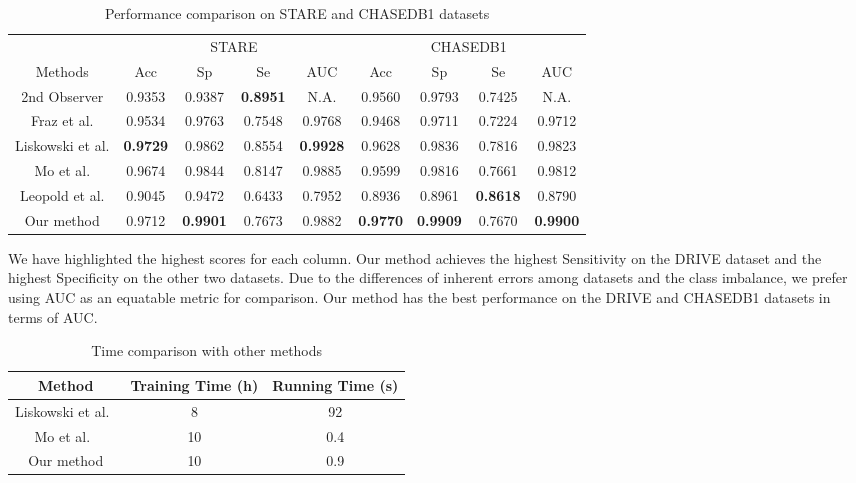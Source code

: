\documentclass[runningheads,a4paper]{llncs}
\begin{document}
\begin{table}[h]
	\centering
	\vspace{-5pt}
	\caption{Performance comparison on STARE and CHASEDB1 datasets}
	\vspace{-5pt}
	\begin{tabular}{c|c|c|c|c|c|c|c|c}
		\toprule
		&\multicolumn{4}{|c|}{STARE}&\multicolumn{4}{|c}{CHASEDB1}\\
		Methods&Acc&Sp&Se&AUC&Acc&Sp&Se&AUC\\
		\midrule	
		2nd Observer&0.9353&0.9387&\textbf{0.8951}&N.A.&0.9560&0.9793&0.7425&N.A.\\
		Fraz et al. \cite{fraz2012ensemble}	&0.9534	&0.9763	&0.7548	&0.9768&0.9468	&0.9711	&0.7224	&0.9712\\
		Liskowski et al. \cite{liskowski2016segmenting} &\textbf{0.9729}	&0.9862	&0.8554	&\textbf{0.9928}&0.9628	&0.9836	&0.7816	&0.9823\\
		Mo et al. \cite{mo2017multi}	&0.9674	&0.9844	&0.8147	&0.9885&0.9599	&0.9816	&0.7661	&0.9812\\
		Leopold et al. \cite{leopold2017pixelbnn}	&0.9045	&0.9472	&0.6433	&0.7952&0.8936	&0.8961	&\textbf{0.8618}	&0.8790\\
		Our method	&0.9712	&\textbf{0.9901}	&0.7673	&0.9882&\textbf{0.9770}	&\textbf{0.9909}	&0.7670	&\textbf{0.9900}\\
		\bottomrule
	\end{tabular}
	\vspace{-15pt}
	\label{table3}
\end{table}
We have highlighted the highest scores for each column. Our method achieves the highest Sensitivity on the DRIVE dataset and the highest Specificity on the other two datasets. Due to the differences of inherent errors among datasets and the class imbalance, we prefer using AUC as an equatable metric for comparison. Our method has the best performance on the DRIVE and CHASEDB1 datasets in terms of AUC.

\begin{table}[h]
	\centering
	\vspace{-15pt}
	\caption{Time comparison with other methods}
	\vspace{-5pt}
	\begin{tabular}{ccc}
		\toprule
		Method	&Training Time (h)	&Running Time (s)\\
		\midrule	
		Liskowski et al.~\cite{liskowski2016segmenting}	&8	&92\\
		Mo et al.~\cite{mo2017multi}	&10	&0.4\\
		Our method	&10	&0.9\\
		\bottomrule
	\end{tabular}
	\vspace{-20pt}
	\label{table4}
\end{table}
\end{document}
